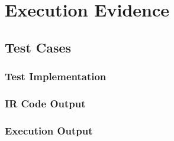 
\chapter{Execution Evidence}

\section{Test Cases}
\subsection{Test Implementation}
\subsection{IR Code Output}
\subsection{Execution Output}
